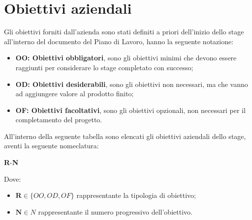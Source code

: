 \pagebreak
\section{Obiettivi aziendali}
\label{sez:obiettivi-aziendali}

Gli obiettivi forniti dall'azienda sono stati definiti a priori dell'inizio dello stage all'interno del documento del Piano di Lavoro, hanno la seguente notazione:
\begin{itemize}
    \item \textbf{OO: Obiettivi obbligatori}, sono gli obiettivi minimi che devono essere raggiunti per considerare lo stage completato con successo;
    \item \textbf{OD: Obiettivi desiderabili}, sono gli obiettivi non necessari, ma che vanno ad aggiungere valore al prodotto finito;
    \item \textbf{OF: Obiettivi facoltativi}, sono gli obiettivi opzionali, non necessari per il completamento del progetto.
\end{itemize}

\noindent All'interno della seguente tabella sono elencati gli obiettivi aziendali dello stage, aventi la seguente nomeclatura:

\begin{center}
    \textbf{R}-\textbf{N}
\end{center}

Dove:
\begin{itemize}
    \item $\textbf{R} \in  \{OO, OD, OF\}$ rappresentante la tipologia di obiettivo; \\
    \item $\textbf{N} \in N$ rappresentante il numero progressivo dell'obiettivo.
\end{itemize}


\renewcommand{\arraystretch}{1.5} %

